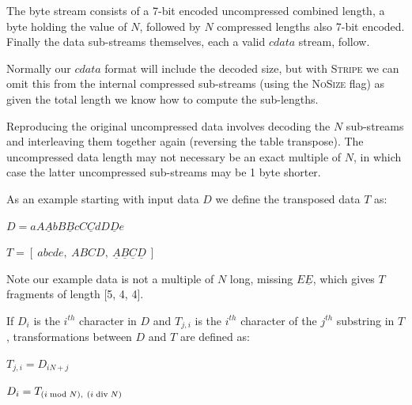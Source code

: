 \documentclass[a4paper]{article}
\begin{document}
The byte stream consists of a 7-bit encoded uncompressed combined
length, a byte holding the value of $N$, followed by $N$ compressed
lengths also 7-bit encoded.  Finally the data sub-streams themselves,
each a valid $cdata$ stream, follow.

Normally our $cdata$ format will include the decoded size, but with
\textsc{Stripe} we can omit this from the internal compressed sub-streams
(using the \textsc{NoSize} flag) as given the total length we know how to compute the sub-lengths.

Reproducing the original uncompressed data involves decoding the $N$
sub-streams and interleaving them together again (reversing the table
transpose).  The uncompressed data length may not necessary be an exact
multiple of $N$, in which case the latter uncompressed sub-streams may
be 1 byte shorter.

As an example starting with input data $D$ we define the transposed data $T$ as:

\hspace{1cm}
$D = aA\underline{A}bB\underline{B}cC\underline{C}dD\underline{D}e$

\hspace{1cm}
$T = [\ abcde,\ ABCD,\ \underline{A}\underline{B}\underline{C}\underline{D}\ ]$

Note our example data is not a multiple of $N$ long, missing
$E\underline{E}$, which gives $T$ fragments of length [5, 4, 4].

If $D_i$ is the $i^{th}$ character in $D$ and $T_{j,i}$ is the
$i^{th}$ character of the $j^{th}$ substring in $T$, transformations
between $D$ and $T$ are defined as:

\hspace{1cm}
$T_{j,i} = D_{i N +j}$

\hspace{1cm}
$D_i = T_{(i \bmod N),\ (i \bdiv N)}$


\end{document}
